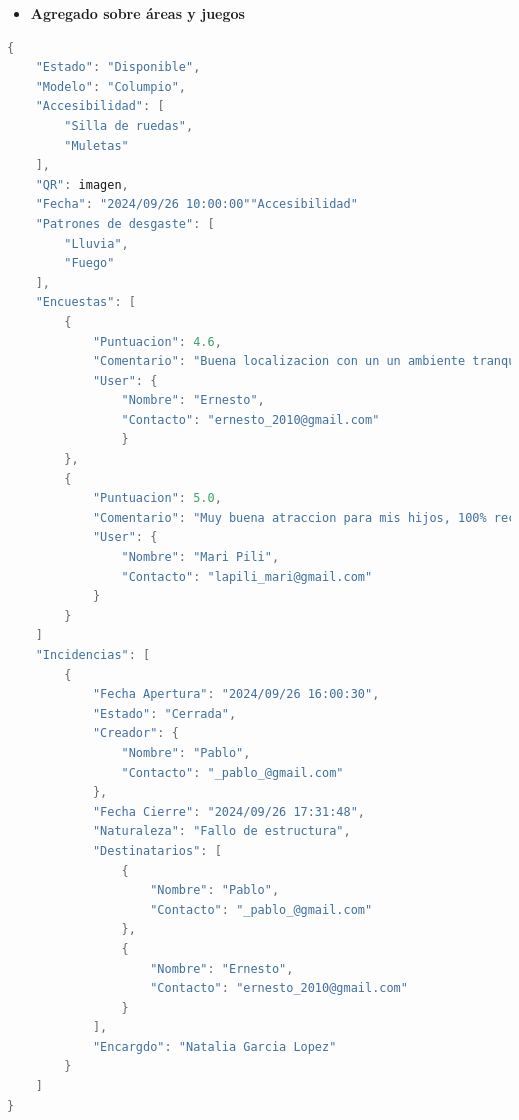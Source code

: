 \documentclass[]{article}
\begin{document}
\begin{itemize}
    \item \textbf{Agregado sobre áreas y juegos}
\end{itemize}
\begin{lstlisting}[caption=Ejemplo de JSON para Agregado sobre Indicencias y Encuestas, language=C, stringstyle=\color{miverde}]
{
    "Estado": "Disponible",
    "Modelo": "Columpio",
    "Accesibilidad": [
        "Silla de ruedas",
        "Muletas"
    ],
    "QR": imagen,
    "Fecha": "2024/09/26 10:00:00""Accesibilidad"
    "Patrones de desgaste": [
        "Lluvia",
        "Fuego"
    ],
    "Encuestas": [
        {
            "Puntuacion": 4.6,
            "Comentario": "Buena localizacion con un un ambiente tranquilo",
            "User": {
                "Nombre": "Ernesto",
                "Contacto": "ernesto_2010@gmail.com"
                }
        },
        {
            "Puntuacion": 5.0,
            "Comentario": "Muy buena atraccion para mis hijos, 100% recomendado",
            "User": {
                "Nombre": "Mari Pili",
                "Contacto": "lapili_mari@gmail.com"
            }
        }
    ]
    "Incidencias": [
        {
            "Fecha Apertura": "2024/09/26 16:00:30",
            "Estado": "Cerrada",
            "Creador": {
                "Nombre": "Pablo",
                "Contacto": "_pablo_@gmail.com"
            },
            "Fecha Cierre": "2024/09/26 17:31:48",
            "Naturaleza": "Fallo de estructura",
            "Destinatarios": [
                {
                    "Nombre": "Pablo",
                    "Contacto": "_pablo_@gmail.com"
                },
                {
                    "Nombre": "Ernesto",
                    "Contacto": "ernesto_2010@gmail.com"
                }
            ],
            "Encargdo": "Natalia Garcia Lopez"
        }
    ]
}
\end{lstlisting}
\end{document}
